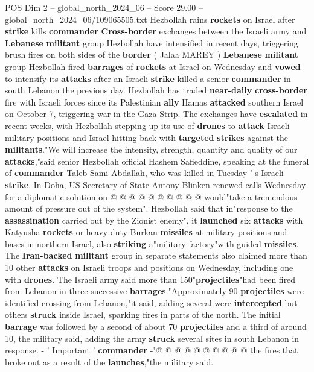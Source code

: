 \begin{textsample}{POS Dim 2 – global\_north\_2024\_06 – Score 29.00 – global\_north\_2024\_06/109065505.txt}  \label{ex:f2_pos_311}
Hezbollah rains \textbf{rockets} on Israel after \textbf{strike} kills \textbf{commander} \textbf{Cross-border} exchanges between the Israeli army and \textbf{Lebanese} \textbf{militant} group Hezbollah have intensified in recent days, triggering brush fires on both sides of the \textbf{border} ( Jalaa MAREY ) \textbf{Lebanese} \textbf{militant} group Hezbollah fired \textbf{barrages} of \textbf{rockets} at Israel on Wednesday and \textbf{vowed} to intensify its \textbf{attacks} after an Israeli \textbf{strike} killed a senior \textbf{commander} in south Lebanon the previous day.
Hezbollah has traded \textbf{near-daily} \textbf{cross-border} fire with Israeli forces since its Palestinian \textbf{ally} Hamas \textbf{attacked} southern Israel on October 7, triggering war in the Gaza Strip.
The exchanges have \textbf{escalated} in recent weeks, with Hezbollah stepping up its use of \textbf{drones} to \textbf{attack} Israeli military positions and Israel hitting back with \textbf{targeted} \textbf{strikes} against the \textbf{militants}."We will increase the intensity, strength, quantity and quality of our \textbf{attacks},"said senior Hezbollah official Hashem Safieddine, speaking at the funeral of \textbf{commander} Taleb Sami Abdallah, who was killed in Tuesday ' s Israeli \textbf{strike}.
In Doha, US Secretary of State Antony Blinken renewed calls Wednesday for a diplomatic solution on @ @ @ @ @ @ @ @ @ @ would"take a tremendous amount of pressure out of the system".
Hezbollah said that in"response to the \textbf{assassination} carried out by the Zionist enemy", it \textbf{launched} six \textbf{attacks} with Katyusha \textbf{rockets} or heavy-duty Burkan \textbf{missiles} at military positions and bases in northern Israel, also \textbf{striking} a"military factory"with guided \textbf{missiles}.
The \textbf{Iran-backed} \textbf{militant} group in separate statements also claimed more than 10 other \textbf{attacks} on Israeli troops and positions on Wednesday, including one with \textbf{drones}.
The Israeli army said more than 150"\textbf{projectiles}"had been fired from Lebanon in three successive \textbf{barrages}."Approximately 90 \textbf{projectiles} were identified crossing from Lebanon,"it said, adding several were \textbf{intercepted} but others \textbf{struck} inside Israel, sparking fires in parts of the north.
The initial \textbf{barrage} was followed by a second of about 70 \textbf{projectiles} and a third of around 10, the military said, adding the army \textbf{struck} several sites in south Lebanon in response. - ' Important ' \textbf{commander} -"@ @ @ @ @ @ @ @ @ @ the fires that broke out as a result of the \textbf{launches},"the military said.

\end{textsample}
